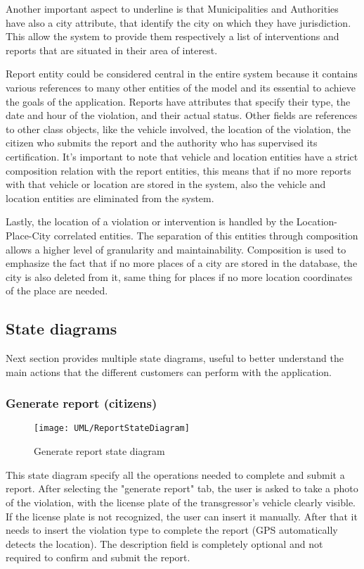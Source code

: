 Another important aspect to underline is that Municipalities and Authorities have also a city attribute, that identify the city on which they have jurisdiction. This allow the system to provide them respectively a list of  interventions and reports that are situated in their area of interest. 

Report entity could be considered central in the entire system because it contains various references to many other entities of the model and its essential to achieve the goals of the application. Reports have attributes that specify their type, the date and hour of the violation, and their actual status. Other fields are references to other class objects, like the vehicle involved, the location of the violation, the citizen who submits the report and the authority who has supervised its certification. It's important to note that vehicle and location entities have a strict composition relation with the report entities, this means that if no more reports with that vehicle or location are stored in the system, also the vehicle and location entities are eliminated from the system.

Lastly, the location of a violation or intervention is handled by the Location-Place-City correlated entities. The separation of this entities through composition allows a higher level of granularity and maintainability. Composition is used to emphasize the fact that if no more places of a city are stored in the database, the city is also deleted from it, same thing for places if no more location coordinates of the place are needed.

\subsection{State diagrams}

Next section provides multiple state diagrams, useful to better understand the main actions that the different customers can perform with the application.

\subsubsection{Generate report (citizens)}

\begin{figure}[H]
	\centering
	\texttt{[image: UML/ReportStateDiagram]}
	\caption{Generate report state diagram}
\end{figure}

This state diagram specify all the operations needed to complete and submit a report. After selecting the "generate report" tab, the user is asked to take a photo of the violation, with the license plate of the transgressor's vehicle clearly visible. If the license plate is not recognized, the user can insert it manually. After that it needs to insert the violation type to complete the report (GPS automatically detects the location). The description field is completely optional and not required to confirm and submit the report.

